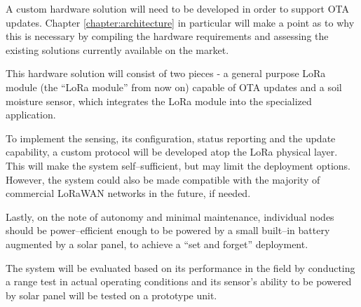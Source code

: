 A custom hardware solution will need to be developed in order to support OTA updates. Chapter \ref{chapter:architecture} in particular will make a point as to why this is necessary by compiling the hardware requirements and assessing the existing solutions currently available on the market. 

This hardware solution will consist of two pieces - a general purpose LoRa module (the ``LoRa module'' from now on) capable of OTA updates and a soil moisture sensor, which integrates the LoRa module into the specialized application.

To implement the sensing, its configuration, status reporting and the update capability, a custom protocol will be developed atop the LoRa physical layer. This will make the system self--sufficient, but may limit the deployment options. However, the system could also be made compatible with the majority of commercial LoRaWAN networks in the future, if needed.

Lastly, on the note of autonomy and minimal maintenance, individual nodes should be power--efficient enough to be powered by a small built--in battery augmented by a solar panel, to achieve a ``set and forget'' deployment. 

The system will be evaluated based on its performance in the field by conducting a range test in actual operating conditions and its sensor's ability to be powered by solar panel will be tested on a prototype unit.
